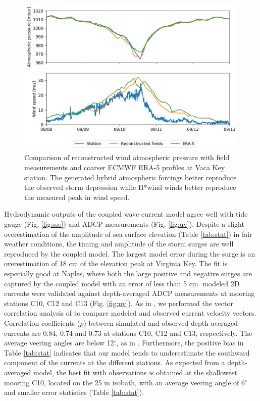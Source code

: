 \documentclass[preprint,12pt,authoryear]{elsarticle}
\begin{document}
\begin{figure}
    \centering
    \includegraphics[width=.95\textwidth]{fig/validation_met_2.png}
    \caption{Comparison of reconstructed wind atmospheric pressure with field measurements and coarser ECMWF ERA-5 profiles at Vaca Key station. The generated hybrid atmospheric forcings better reproduce the observed storm depression while H*wind winds better reproduce the measured peak in wind speed.}
    \label{fig:forcings}
\end{figure}

Hydrodynamic outputs of the coupled wave-current model agree well with tide gauge (Fig. \ref{fig:sse}) and ADCP measurements (Fig. \ref{fig:uv}). Despite a slight overestimation of the amplitude of sea surface elevation (Table \ref{tab:stat}) in fair weather conditions, the timing and amplitude of the storm surges are well reproduced by the coupled model. The largest model error during the surge is an overestimation of 18 cm of the elevation peak at Virginia Key. The fit is especially good at Naples, where both the large positive and negative surges are captured by the coupled model with an error of less than 5 cm. modeled 2D currents were validated against depth-averaged ADCP measurements at mooring stations C10, C12 and C13 (Fig. \ref{fig:uv}). As in \cite{liu2020impacts}, we performed the vector correlation analysis of \cite{kundu1976ekman} to compare modeled and observed current velocity vectors. Correlation coefficients ($\rho$) between simulated and observed depth-averaged currents are 0.84, 0.74 and 0.73 at stations C10, C12 and C13, respectively. The average veering angles are below 12$^\circ$, as in \citep{liu2020impacts}. Furthermore, the positive bias in Table \ref{tab:stat} indicates that our model tends to underestimate the southward component of the currents at the different stations. As expected from a depth-averaged model, the best fit with observations is obtained at the shallowest mooring C10, located on the 25 m isobath, with an average veering angle of 6$^\circ$ and smaller error statistics (Table \ref{tab:stat}). 
\end{document}
